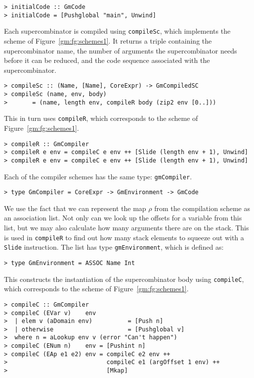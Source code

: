 \begin{verbatim}
> initialCode :: GmCode
> initialCode = [Pushglobal "main", Unwind]
\end{verbatim}
%
%
\par
Each supercombinator is compiled using \mbox{\tt compileSc}, which implements
the \tSC{} scheme of Figure~\ref{gm:fg:schemes1}. It returns a triple
containing the supercombinator name, the number of arguments the
supercombinator needs before it can be reduced, and the code sequence
associated with the supercombinator.
\begin{verbatim}
> compileSc :: (Name, [Name], CoreExpr) -> GmCompiledSC
> compileSc (name, env, body)
>       = (name, length env, compileR body (zip2 env [0..]))
\end{verbatim}
%
%
This in turn uses \mbox{\tt compileR}, which corresponds to the \tR{} scheme of
Figure~\ref{gm:fg:schemes1}.
\begin{verbatim}
> compileR :: GmCompiler
> compileR e env = compileC e env ++ [Slide (length env + 1), Unwind]
> compileR e env = compileC e env ++ [Slide (length env + 1), Unwind]
\end{verbatim}
%
%
%
Each of the compiler schemes has the same type: \mbox{\tt gmCompiler}.
\begin{verbatim}
> type GmCompiler = CoreExpr -> GmEnvironment -> GmCode
\end{verbatim}
%
\par
We use the fact that we can represent the map $\rho$ from the
compilation scheme as an association list. Not only can we look up the
offsets for a variable from this list, but we may also calculate how
many arguments there are on the stack. This is used in \mbox{\tt compileR} to
find out how many stack elements to squeeze out with a \mbox{\tt Slide}
instruction. The list has type \mbox{\tt gmEnvironment}, which is defined as:
\begin{verbatim}
> type GmEnvironment = ASSOC Name Int
\end{verbatim}
%
This constructs the instantiation of the supercombinator body using
\mbox{\tt compileC}, which corresponds to the \tC{} scheme
of Figure~\ref{gm:fg:schemes1}.
\begin{verbatim}
> compileC :: GmCompiler
> compileC (EVar v)    env 
>  | elem v (aDomain env)          = [Push n]
>  | otherwise                     = [Pushglobal v]
>  where n = aLookup env v (error "Can't happen")
> compileC (ENum n)    env = [Pushint n]
> compileC (EAp e1 e2) env = compileC e2 env ++
>                            compileC e1 (argOffset 1 env) ++
>                            [Mkap]
\end{verbatim}
